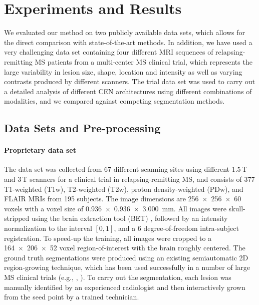 
\section{Experiments and Results}


We evaluated our method on two publicly available data sets, which allows for
the direct comparison with state-of-the-art methods. In addition, we have used a
very challenging data set containing four different MRI sequences of
relapsing-remitting MS patients from a multi-center MS clinical trial, which
represents the large variability in lesion size, shape, location and intensity
as well as varying contrasts produced by different scanners. The trial data set
was used to carry out a detailed analysis of different CEN architectures using
different combinations of modalities, and we compared against competing
segmentation methods.

\subsection{Data Sets and Pre-processing}



\paragraph{Proprietary data set}

The data set was collected from 67 different scanning sites using different
1.5\,T and 3\,T scanners for a clinical trial in relapsing-remitting MS, and
consists of 377 T1-weighted (T1w), T2-weighted (T2w), proton density-weighted
(PDw), and FLAIR MRIs from 195 subjects. The image dimensions are
\num{256x256x60} voxels with a voxel size of
\SI{0.936x0.936x3.000}{\milli\metre}. All images were skull-stripped using the
brain extraction tool (BET) \cite{jenkinson2005bet2}, followed by an intensity
normalization to the interval $[0,1]$, and a 6 degree-of-freedom intra-subject
registration. To speed-up the training, all images were cropped to a
\num{164x206x52} voxel region-of-interest with the brain roughly centered. The
ground truth segmentations were produced using an existing semiautomatic 2D
region-growing technique, which has been used successfully in a number of large
MS clinical trials (e.g., \cite{kappos2006long},
\cite{traboulsee2008reduction}). To carry out the segmentation, each lesion was
manually identified by an experienced radiologist and then interactively grown
from the seed point by a trained technician.

